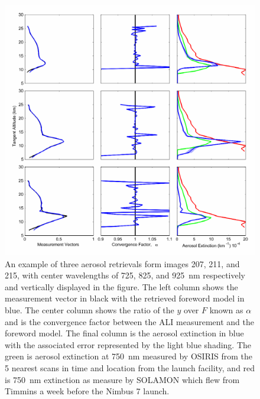 \documentclass[12pt]{article}
\begin{document}
\begin{figure}
\includegraphics[width=1.0\textwidth]{./Images/AliRetreivals.pdf}
    \caption[ALI Radiances]{An example of three aerosol retrievals form images 207, 211, and 215, with center wavelengths of 725, 825, and 925~nm respectively and vertically displayed in the figure. The left column shows the measurement vector in black with the retrieved foreword model in blue. The center column shows the ratio of the $y$ over $F$ known as $\alpha$ and is the convergence factor between the ALI measurement and the foreword model. The final column is the aerosol extinction in blue with the associated error represented by the light blue shading. The green is aerosol extinction at 750~nm measured by OSIRIS from the 5 nearest scans in time and location from the launch facility, and red is 750~nm extinction as measure by SOLAMON which flew from Timmins a week before the Nimbus 7 launch.}
    \label{fig:AliRetreivals}
\end{figure}
\end{document}
